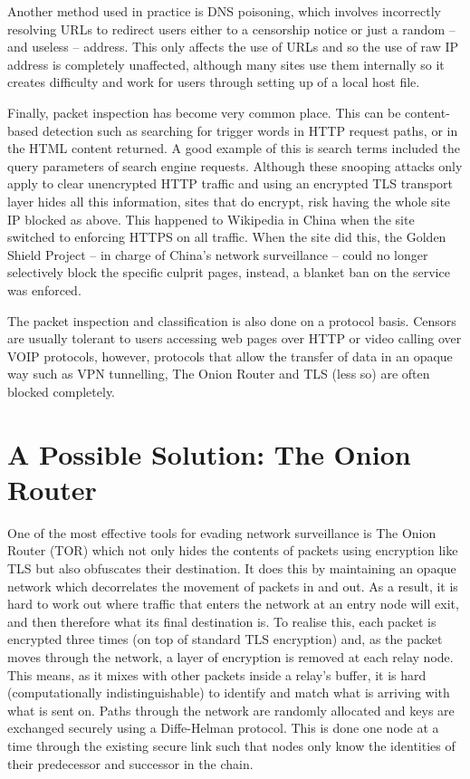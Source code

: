 \documentclass[ %
                    author={Samuel Russell},
                supervisor={Prof. Bogdan Warinschi},
                    degree={MEng},
                     title={Innocuous Ciphertexts},
                  subtitle={The DE-CENSOR Scheme},
                      type={Research},
                      year={2018} ]{dissertation}
\begin{document}
Another method used in practice is DNS poisoning, which involves incorrectly resolving URLs to redirect users either to a censorship notice or just a random -- and useless -- address. This only affects the use of URLs and so the use of raw IP address is completely unaffected, although many sites use them internally so it creates difficulty and work for users through setting up of a local host file.

Finally, packet inspection has become very common place. This can be content-based detection such as searching for trigger words in HTTP request paths, or in the HTML content returned. A good example of this is search terms included the query parameters of search engine requests. Although these snooping attacks only apply to clear unencrypted HTTP traffic and using an encrypted  TLS transport layer hides all this information, sites that do encrypt, risk having the whole site IP blocked as above. This happened to Wikipedia in China when the site switched to enforcing HTTPS on all traffic. When the site did this, the Golden Shield Project -- in charge of China's network surveillance -- could no longer selectively block the specific culprit pages, instead, a blanket ban on the service was enforced.

The packet inspection and classification is also done on a protocol basis. Censors are usually tolerant to users accessing web pages over HTTP or video calling over VOIP protocols, however, protocols that allow the transfer of data in an opaque way such as VPN tunnelling, The Onion Router and TLS (less so) are often blocked completely.

\section{A Possible Solution: The Onion Router}

One of the most effective tools for evading network surveillance is The Onion Router (TOR) which not only hides the contents of packets using encryption like TLS but also obfuscates their destination. It does this by maintaining an opaque network which decorrelates the movement of packets in and out. As a result, it is hard to work out where traffic that enters the network at an entry node will exit, and then therefore what its final destination is. To realise this, each packet is encrypted three times (on top of standard TLS encryption) and, as the packet moves through the network, a layer of encryption is removed at each relay node. This means, as it mixes with other packets inside a relay's buffer, it is hard (computationally indistinguishable) to identify and match what is arriving with what is sent on. Paths through the network are randomly allocated and keys are exchanged securely using a Diffe-Helman protocol. This is done one node at a time through the existing secure link such that nodes only know the identities of their predecessor and successor in the chain.
\end{document}
